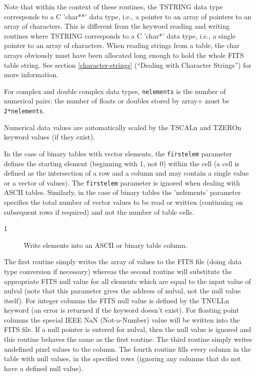\documentclass[11pt]{book}
\begin{document}
Note that within the context of these routines, the TSTRING data type
corresponds to a C 'char**' data type, i.e., a pointer to an array of
pointers to an array of characters.  This is different from the keyword
reading and writing routines where TSTRING corresponds to a C 'char*'
data type, i.e., a single pointer to an array of characters.  When
reading strings from a table, the char arrays obviously must have been
allocated long enough to hold the whole FITS table string.
See section \ref{character-strings}
(``Dealing with Character Strings'') for more information.

For complex and double complex data types, \verb+nelements+ is the number
of numerical pairs; the number of floats or doubles stored by
\+array+ must be \verb+2*nelements+.

Numerical data values are automatically scaled by the TSCALn and TZEROn
keyword values (if they exist).

In the case of binary tables with vector elements, the \verb+firstelem+
parameter defines the starting element (beginning with 1, not 0) within
the cell (a cell is defined as the intersection of a row and a column
and may contain a single value or a vector of values).  The \verb+firstelem+
parameter is ignored when dealing with ASCII tables. Similarly, in the
case of binary tables the 'nelements' parameter specifies the total
number of vector values to be read or written (continuing on subsequent
rows if required) and not the number of table cells.


\begin{description}
\item[1 ] Write elements into an ASCII or binary table column.
\end{description}
   The first routine simply writes the array of values to the FITS file
   (doing data type conversion if necessary) whereas the second routine
   will substitute the  appropriate FITS null value for all elements
   which are equal to the input value of nulval (note that this
   parameter gives the address of nulval, not the null value
   itself).  For integer columns the FITS null value is defined by the
   TNULLn keyword (an error is returned if the keyword doesn't exist).
   For floating point columns  the special IEEE NaN (Not-a-Number)
   value will be written into the FITS file.  If a null pointer is
   entered for nulval, then the null value is ignored and this routine
   behaves the same as the first routine.  The third routine
   simply writes undefined pixel values to the column.  The fourth routine
   fills every column in the table with null values, in the specified
   rows (ignoring any columns that do not have a defined null value).
   \label{ffpcl} \label{ffpcn} \label{ffpclu}
\end{document}
